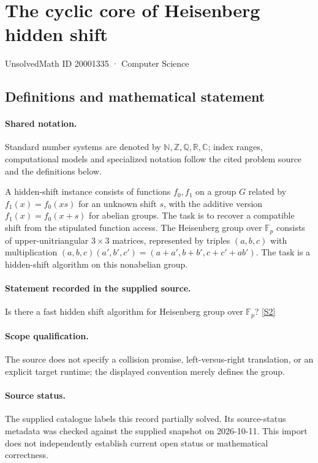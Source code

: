 \documentclass[11pt]{article}
\newcommand{\sref}[2]{\hyperlink{source:#1:#2}{[S#2]}}
\begin{document}
\setcounter{section}{20001334}
\section{The cyclic core of Heisenberg hidden shift}\label{20001335}
{\small\sffamily UnsolvedMath ID 20001335 · Computer Science}
\subsection{Definitions and mathematical statement}

\paragraph{Shared notation.}Standard number systems are denoted by $\mathbb N,\mathbb Z,\mathbb Q,\mathbb R,\mathbb C$; index ranges, computational models and specialized notation follow the cited problem source and the definitions below.


A hidden-shift instance consists of functions $f_0,f_1$ on a group $G$ related by $f_1(x)=f_0(xs)$ for an unknown shift $s$, with the additive version $f_1(x)=f_0(x+s)$ for abelian groups. The task is to recover a compatible shift from the stipulated function access. The Heisenberg group over $\mathbb F_p$ consists of upper-unitriangular $3\times3$ matrices, represented by triples $(a,b,c)$ with multiplication $(a,b,c)(a',b',c')=(a+a',b+b',c+c'+ab')$. The task is a hidden-shift algorithm on this nonabelian group.
\paragraph{Statement recorded in the supplied source.}
Is there a fast hidden shift algorithm for Heisenberg group over $\mathbb F_p$? \sref{20001335}{2}
\paragraph{Scope qualification.}
The source does not specify a collision promise, left-versus-right translation, or an explicit target runtime; the displayed convention merely defines the group.
\paragraph{Source status.}
The supplied catalogue labels this record partially solved. Its source-status metadata was checked against the supplied snapshot on 2026-10-11. This import does not independently establish current open status or mathematical correctness.
\end{document}
